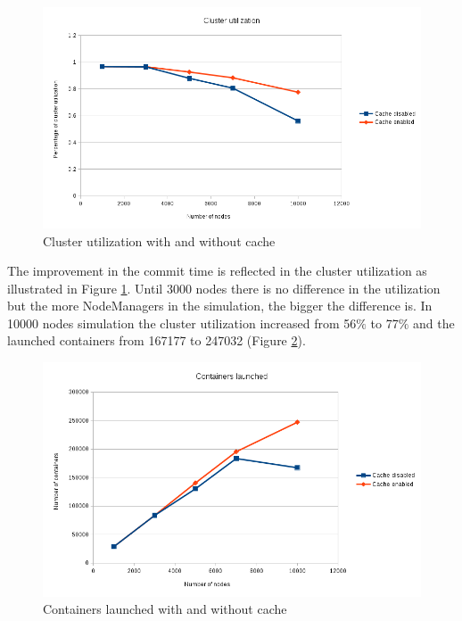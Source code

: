\begin{figure}
\centering
\includegraphics[scale=0.6]{resources/images/Evaluation/dto_cache_cluster_util.png}
\caption{Cluster utilization with and without cache}
\label{fig:ev_cache_cluster_util}
\end{figure}

The improvement in the commit time is reflected in the cluster
utilization as illustrated in Figure \ref{fig:ev_cache_cluster_util}.
Until 3000 nodes there is no difference in the utilization but the more
NodeManagers in the simulation, the bigger the difference is. In 10000
nodes simulation the cluster utilization increased from 56$\%$ to
77$\%$ and the launched containers from 167177 to 247032 (Figure
\ref{fig:ev_cache_containers}).

\begin{figure}
\centering
\includegraphics[scale=0.6]{resources/images/Evaluation/dto_cache_containers.png}
\caption{Containers launched with and without cache}
\label{fig:ev_cache_containers}
\end{figure}

